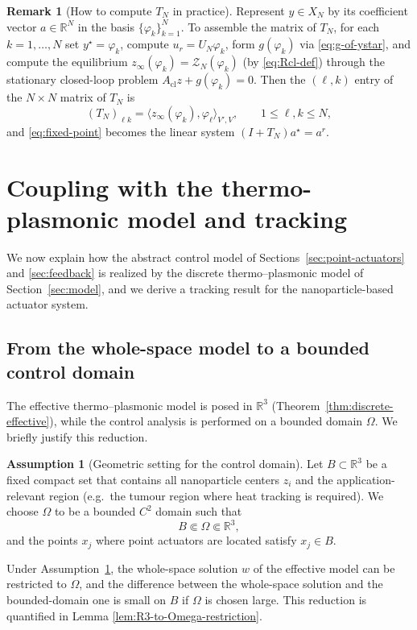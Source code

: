 \documentclass[11pt,a4paper]{article}
\numberwithin{equation}{section}
\theoremstyle{definition}
\newtheorem{remark}[theorem]{Remark}
\newtheorem{assumption}[theorem]{Assumption}
\newcommand{\R}{\mathbb{R}}
\newcommand{\Om}{\Omega}
\newcommand{\1}{\mathbbm{1}}
\begin{document}
\begin{remark}[How to compute $T_N$ in practice]
\label{rem:compute-TN}
Represent $y\in X_N$ by its coefficient vector $a\in\mathbb{R}^N$ in the basis $\{\varphi_k\}_{k=1}^N$.
To assemble the matrix of $T_N$, for each $k=1,\dots,N$ set $y^\star=\varphi_k$, compute $u_r=U_N\varphi_k$,
form $g(\varphi_k)$ via \eqref{eq:g-of-ystar}, and compute the equilibrium $z_\infty(\varphi_k)=\mathcal{Z}_N(\varphi_k)$
(by \eqref{eq:Rcl-def}) through the stationary closed-loop problem $A_{\mathrm{cl}}z+g(\varphi_k)=0$. Then the $(\ell,k)$ entry of the
$N\times N$ matrix of $T_N$ is
\[
(T_N)_{\ell k} = \langle z_\infty(\varphi_k),\varphi_\ell\rangle_{V',V},\qquad 1\le \ell,k\le N,
\]
and \eqref{eq:fixed-point} becomes the linear system $(I+T_N)a^\star=a^r$.
\end{remark}



\section{Coupling with the thermo-plasmonic model and tracking}
\label{sec:coupling}
\noindent
We now explain how the abstract control model of Sections~\ref{sec:point-actuators}
and \ref{sec:feedback} is realized by the discrete thermo--plasmonic model
of Section~\ref{sec:model}, and we derive a tracking result for the
nanoparticle-based actuator system.

\subsection{From the whole-space model to a bounded control domain}
\noindent
The effective thermo--plasmonic model is posed in $\R^3$
(Theorem~\ref{thm:discrete-effective}), while the control analysis is
performed on a bounded domain $\Om$. We briefly justify this reduction.

\begin{assumption}[Geometric setting for the control domain]
\label{ass:Omega-large}
Let $B\subset\R^3$ be a fixed compact set that contains all nanoparticle
centers $z_i$ and the application-relevant region (e.g.\ the tumour region
where heat tracking is required). We choose $\Om$ to be a bounded $C^2$
domain such that
\[
B \Subset \Om \Subset \R^3,
\]
and the points $x_j$ where point actuators are located satisfy $x_j\in B$.
\end{assumption}
\noindent
Under Assumption~\ref{ass:Omega-large}, the whole-space solution $w$ of the
effective model can be restricted to $\Om$, and the difference between the
whole-space solution and the bounded-domain one is small on $B$ if $\Om$
is chosen large. This reduction is quantified in Lemma \ref{lem:R3-to-Omega-restriction}.
\end{document}
